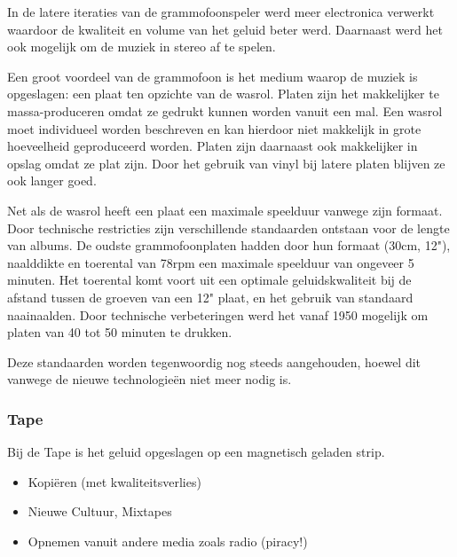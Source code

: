 In de latere iteraties van de grammofoonspeler werd meer electronica verwerkt waardoor de kwaliteit en volume van het geluid beter werd. Daarnaast werd het ook mogelijk om de muziek in stereo af te spelen.

Een groot voordeel van de grammofoon is het medium waarop de muziek is opgeslagen: een plaat ten opzichte van de wasrol. Platen zijn het makkelijker te massa-produceren omdat ze gedrukt kunnen worden vanuit een mal. Een wasrol moet individueel worden beschreven en kan hierdoor niet makkelijk in grote hoeveelheid geproduceerd worden. Platen zijn daarnaast ook makkelijker in opslag omdat ze plat zijn. Door het gebruik van vinyl bij latere platen blijven ze ook langer goed.

Net als de wasrol heeft een plaat een maximale speelduur vanwege zijn formaat. Door technische restricties zijn verschillende standaarden ontstaan voor de lengte van albums. De oudste grammofoonplaten hadden door hun formaat (30cm, 12"), naalddikte en toerental van 78rpm een maximale speelduur van ongeveer 5 minuten. Het toerental komt voort uit een optimale geluidskwaliteit bij de afstand tussen de groeven van een 12" plaat, en het gebruik van standaard naainaalden. Door technische verbeteringen werd het vanaf 1950 mogelijk om platen van 40 tot 50 minuten te drukken.

Deze standaarden worden tegenwoordig nog steeds aangehouden, hoewel dit vanwege de nieuwe technologieën niet meer nodig is.


\subsubsection*{Tape}
Bij de Tape is het geluid opgeslagen op een magnetisch geladen strip.


\begin{itemize}
    \item Kopiëren (met kwaliteitsverlies)
    \item Nieuwe Cultuur, Mixtapes
    \item Opnemen vanuit andere media zoals radio (piracy!)
\end{itemize}


